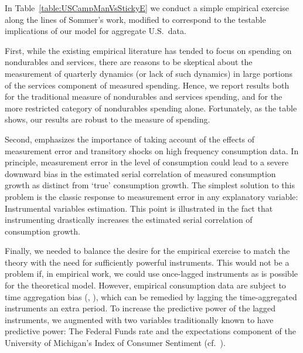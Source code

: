 

In Table~\ref{table:USCampManVsStickyE} we conduct a simple empirical exercise along the lines of Sommer's work, modified to correspond to the testable implications of our model for aggregate U.S.\ data.

First, while the existing empirical literature has tended to focus on spending on nondurables and services, there are reasons to be skeptical about the measurement of quarterly dynamics (or lack of such dynamics) in large portions of the services component of measured spending.
Hence, we report results both for the traditional measure of nondurables and services spending, and for the more restricted category of nondurables spending alone.  Fortunately, as the table shows, our results are robust to the measure of spending. %

Second, \cite{som07} emphasizes the importance of taking account of the effects of measurement error and transitory shocks on high frequency consumption data.  In principle, measurement error in the level of consumption could lead to a severe downward bias in the estimated serial correlation of measured consumption growth as distinct from `true' consumption growth.  The simplest solution to this problem is the classic response to measurement error in any explanatory variable: Instrumental variables estimation.  This point is illustrated in the fact that instrumenting drastically increases the estimated serial correlation of consumption growth.

Finally, we needed to balance the desire for the empirical exercise to match the theory with the need for sufficiently powerful instruments.  This would not be a problem if, in empirical work, we could use once-lagged instruments as is possible for the theoretical model.  However, empirical consumption data are subject to time aggregation bias (\cite{workingTimeAgg}, \cite{cmModel}), which can be remedied by lagging the time-aggregated instruments an extra period.  To increase the predictive power of the lagged instruments, we augmented with two variables traditionally known to have predictive power: The Federal Funds rate and the expectations component of the University of Michigan's Index of Consumer Sentiment (cf.\ \cite{cfwSentiment}). %

